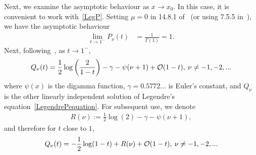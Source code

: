 Next, we examine the asymptotic behaviour as $x\rightarrow x_0$. In this
case, it is convenient to work with~\eqref{LegP}. Setting $\mu=0$ in
14.8.1 of~\cite{fatAbramowitz} (or using 7.5.5 in~\cite{lebedev}), we
have the asymptotic behaviour
\begin{align} 
  \label{Pasymptotics}
  \lim_{t\rightarrow 1^- } P_\nu(t)&= \frac{1}{\Gamma(1)}=1.
\end{align}
Next, following~\cite{fatAbramowitz}, as $t\rightarrow 1^{-}$,
\begin{align*}
  Q_{\nu}(t)=\frac{1}{2}\log\left(\frac{2}{1-t}\right)-\gamma
  -\psi(\nu+1)+\mathcal{O}(1-t),\: \nu \neq -1,-2,...
\end{align*} 
where $\psi(x)$ is the digamma function, $\gamma=0.5772\ldots$ is
Euler's constant, and $Q_{\nu}$ is the other linearly independent
solution of Legendre's equation~\eqref{LegendrePequation}.  For
subsequent use, we denote 
\begin{align*}
  R(\nu):= \frac{1}{2}\log(2) -\gamma -\psi(\nu+1), 
\end{align*}
and therefore for $t$ close to $1$,
\begin{equation}
  \label{Qasymptotics}
  Q_{\nu}(t)=-\frac{1}{2}\log(1-t) + 
  R(\nu) + \mathcal{O}(1-t),\: \nu \neq -1,-2,... 
\end{equation}

